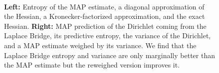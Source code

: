 \begin{figure}[htb]
	 \\ [-5ex]	

	\caption{\textbf{Left:} Entropy of the MAP estimate, a diagonal approximation of the Hessian, a Kronecker-factorized approximation, and the exact Hessian.
	\textbf{Right:} MAP prediction of the Dirichlet coming from the Laplace Bridge, its predictive entropy, the variance of the Dirichlet, and a MAP estimate weighed by its variance. We find that the Laplace Bridge entropy and variance are only marginally better than the MAP estimate but the reweighed version improves it.}
	\label{fig:toy_data}
\end{figure}

